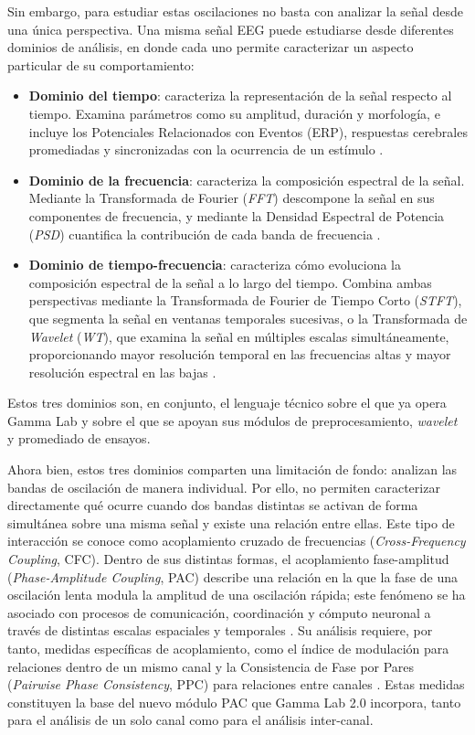 \documentclass[12pt,letterpaper,oneside]{article}
\begin{document}
Sin embargo, para estudiar estas oscilaciones no basta con analizar la señal desde una única perspectiva. Una misma señal EEG puede estudiarse desde diferentes dominios de análisis, en donde cada uno permite caracterizar un aspecto particular de su comportamiento:

\begin{itemize}
    \item \textbf{Dominio del tiempo}: caracteriza la representación de la señal respecto al tiempo. Examina parámetros como su amplitud, duración y morfología, e incluye los Potenciales Relacionados con Eventos (ERP), respuestas cerebrales promediadas y sincronizadas con la ocurrencia de un estímulo \cite{walla2025}.
    \item \textbf{Dominio de la frecuencia}: caracteriza la composición espectral de la señal. Mediante la Transformada de Fourier (\textit{FFT}) descompone la señal en sus componentes de frecuencia, y mediante la Densidad Espectral de Potencia (\textit{PSD}) cuantifica la contribución de cada banda de frecuencia \cite{singh2023, chaddad2023}.
    \item \textbf{Dominio de tiempo-frecuencia}: caracteriza cómo evoluciona la composición espectral de la señal a lo largo del tiempo. Combina ambas perspectivas mediante la Transformada de Fourier de Tiempo Corto (\textit{STFT}), que segmenta la señal en ventanas temporales sucesivas, o la Transformada de \textit{Wavelet} (\textit{WT}), que examina la señal en múltiples escalas simultáneamente, proporcionando mayor resolución temporal en las frecuencias altas y mayor resolución espectral en las bajas \cite{chaddad2023}.
\end{itemize}

Estos tres dominios son, en conjunto, el lenguaje técnico sobre el que ya opera Gamma Lab y sobre el que se apoyan sus módulos de preprocesamiento, \textit{wavelet} y promediado de ensayos.

Ahora bien, estos tres dominios comparten una limitación de fondo: analizan las bandas de oscilación de manera individual. Por ello, no permiten caracterizar directamente qué ocurre cuando dos bandas distintas se activan de forma simultánea sobre una misma señal y existe una relación entre ellas. Este tipo de interacción se conoce como acoplamiento cruzado de frecuencias (\textit{Cross-Frequency Coupling}, CFC). Dentro de sus distintas formas, el acoplamiento fase-amplitud (\textit{Phase-Amplitude Coupling}, PAC) describe una relación en la que la fase de una oscilación lenta modula la amplitud de una oscilación rápida; este fenómeno se ha asociado con procesos de comunicación, coordinación y cómputo neuronal a través de distintas escalas espaciales y temporales \cite{combrisson2020}. Su análisis requiere, por tanto, medidas específicas de acoplamiento, como el índice de modulación para relaciones dentro de un mismo canal \cite{combrisson2020} y la Consistencia de Fase por Pares (\textit{Pairwise Phase Consistency}, PPC) para relaciones entre canales \cite{vinck2010}. Estas medidas constituyen la base del nuevo módulo PAC que Gamma Lab 2.0 incorpora, tanto para el análisis de un solo canal como para el análisis inter-canal.
\end{document}
